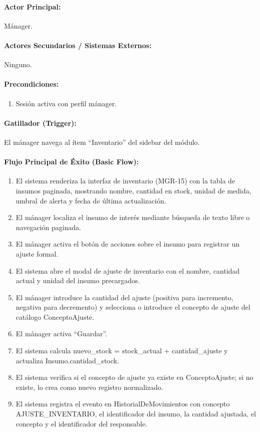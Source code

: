 \paragraph{Actor Principal:} Mánager.

\paragraph{Actores Secundarios / Sistemas Externos:} Ninguno.

\paragraph{Precondiciones:}
\begin{enumerate}
    \item[I.] Sesión activa con perfil mánager.
\end{enumerate}

\paragraph{Gatillador (Trigger):} El mánager navega al ítem ``Inventario'' del sidebar del módulo.

\paragraph{Flujo Principal de Éxito (Basic Flow):}
\begin{enumerate}
    \item[I.] El sistema renderiza la interfaz de inventario (MGR-15) con la tabla de insumos paginada, mostrando nombre, cantidad en stock, unidad de medida, umbral de alerta y fecha de última actualización.
    \item[II.] El mánager localiza el insumo de interés mediante búsqueda de texto libre o navegación paginada.
    \item[III.] El mánager activa el botón de acciones sobre el insumo para registrar un ajuste formal.
    \item[IV.] El sistema abre el modal de ajuste de inventario con el nombre, cantidad actual y unidad del insumo precargados.
    \item[V.] El mánager introduce la cantidad del ajuste (positiva para incremento, negativa para decremento) y selecciona o introduce el concepto de ajuste del catálogo ConceptoAjuste.
    \item[VI.] El mánager activa ``Guardar''.
    \item[VII.] El sistema calcula nuevo\_stock = stock\_actual + cantidad\_ajuste y actualiza Insumo.cantidad\_stock.
    \item[VIII.] El sistema verifica si el concepto de ajuste ya existe en ConceptoAjuste; si no existe, lo crea como nuevo registro normalizado.
    \item[IX.] El sistema registra el evento en HistorialDeMovimientos con concepto AJUSTE\_INVENTARIO, el identificador del insumo, la cantidad ajustada, el concepto y el identificador del responsable.
\end{enumerate}

